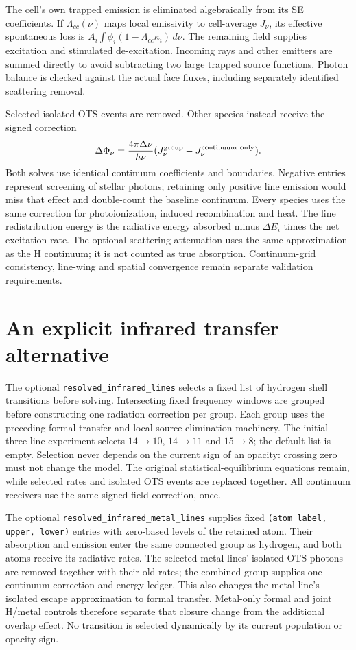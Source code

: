 \documentclass[10pt,a4paper]{article}
\begin{document}
The cell's own trapped emission is eliminated algebraically from its SE
coefficients. If $\Lambda_{cc}(\nu)$ maps local emissivity to cell-average
$J_\nu$, its effective spontaneous loss is
$A_i\int\phi_i(1-\Lambda_{cc}\kappa_i)\,d\nu$.
The remaining field supplies excitation and stimulated de-excitation.
Incoming rays and other emitters are summed directly to avoid subtracting
two large trapped source functions. Photon balance is checked against the
actual face fluxes, including separately identified scattering removal.

Selected isolated OTS events are removed. Other species instead receive
the signed correction
\begin{equation}
 \Delta\Phi_\nu=\frac{4\pi\Delta\nu}{h\nu}
 (J_\nu^{\rm group}-J_\nu^{\rm continuum\ only}).
\end{equation}
Both solves use identical continuum coefficients and boundaries. Negative
entries represent screening of stellar photons; retaining only positive line
emission would miss that effect and double-count the baseline continuum.
Every species uses the same correction for photoionization, induced
recombination and heat. The line redistribution energy is the radiative
energy absorbed minus $\Delta E_i$ times the net excitation rate.
The optional scattering attenuation uses the same approximation as the H
continuum; it is not counted as true absorption. Continuum-grid consistency,
line-wing and spatial convergence remain separate validation requirements.

\section{An explicit infrared transfer alternative}
The optional \texttt{resolved\_infrared\_lines} selects a fixed list of
hydrogen shell transitions before solving. Intersecting fixed frequency
windows are grouped before constructing one radiation correction per group.
Each group uses the preceding formal-transfer and local-source
elimination machinery. The initial three-line experiment selects
$14\to10$, $14\to11$ and $15\to8$; the default list is empty. Selection never depends
on the current sign of an opacity: crossing zero must not change the model.
The original statistical-equilibrium equations remain, while selected rates
and isolated OTS events are replaced together. All continuum receivers use
the same signed field correction, once.

The optional \texttt{resolved\_infrared\_metal\_lines} supplies fixed
\texttt{(atom label, upper, lower)} entries with zero-based levels of the
retained atom. Their absorption and emission enter the same connected group
as hydrogen, and both atoms receive its radiative rates. The selected
metal lines' isolated OTS photons are removed together with their old rates;
the combined group supplies one continuum correction and energy ledger.
This also changes the metal line's isolated escape approximation to formal
transfer. Metal-only formal and joint H/metal controls therefore separate
that closure change from the additional overlap effect. No transition is
selected dynamically by its current population or opacity sign.
\end{document}
